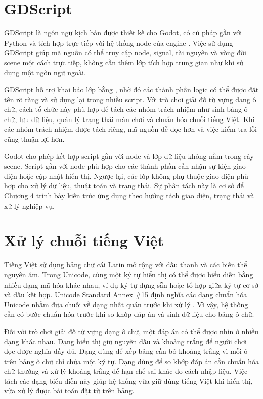 ﻿\documentclass[../DoAn.tex]{subfiles}
\begin{document}
\section{GDScript}
GDScript là ngôn ngữ kịch bản được thiết kế cho Godot, có cú pháp gần với Python và tích hợp trực tiếp với hệ thống node của engine \cite{godotGDScript}. Việc sử dụng GDScript giúp mã nguồn có thể truy cập node, signal, tài nguyên và vòng đời scene một cách trực tiếp, không cần thêm lớp tích hợp trung gian như khi sử dụng một ngôn ngữ ngoài.

GDScript hỗ trợ khai báo lớp bằng , nhờ đó các thành phần logic có thể được đặt tên rõ ràng và sử dụng lại trong nhiều script. Với trò chơi giải đố từ vựng dạng ô chữ, cách tổ chức này phù hợp để tách các nhóm trách nhiệm như sinh bảng ô chữ, lưu dữ liệu, quản lý trạng thái màn chơi và chuẩn hóa chuỗi tiếng Việt. Khi các nhóm trách nhiệm được tách riêng, mã nguồn dễ đọc hơn và việc kiểm tra lỗi cũng thuận lợi hơn.

Godot cho phép kết hợp script gắn với node và lớp dữ liệu không nằm trong cây scene. Script gắn với node phù hợp cho các thành phần cần nhận sự kiện giao diện hoặc cập nhật hiển thị. Ngược lại, các lớp không phụ thuộc giao diện phù hợp cho xử lý dữ liệu, thuật toán và trạng thái. Sự phân tách này là cơ sở để Chương 4 trình bày kiến trúc ứng dụng theo hướng tách giao diện, trạng thái và xử lý nghiệp vụ.

\section{Xử lý chuỗi tiếng Việt}
Tiếng Việt sử dụng bảng chữ cái Latin mở rộng với dấu thanh và các biến thể nguyên âm. Trong Unicode, cùng một ký tự hiển thị có thể được biểu diễn bằng nhiều dạng mã hóa khác nhau, ví dụ ký tự dựng sẵn hoặc tổ hợp giữa ký tự cơ sở và dấu kết hợp. Unicode Standard Annex \#15 định nghĩa các dạng chuẩn hóa Unicode nhằm đưa chuỗi về dạng nhất quán trước khi xử lý \cite{unicodeNormalization}. Vì vậy, hệ thống cần có bước chuẩn hóa trước khi so khớp đáp án và sinh dữ liệu cho bảng ô chữ.

Đối với trò chơi giải đố từ vựng dạng ô chữ, một đáp án có thể được nhìn ở nhiều dạng khác nhau. Dạng hiển thị giữ nguyên dấu và khoảng trắng để người chơi đọc được nghĩa đầy đủ. Dạng dùng để xếp bảng cần bỏ khoảng trắng vì mỗi ô trên bảng ô chữ chỉ chứa một ký tự. Dạng dùng để so khớp đáp án cần chuẩn hóa chữ thường và xử lý khoảng trắng để hạn chế sai khác do cách nhập liệu. Việc tách các dạng biểu diễn này giúp hệ thống vừa giữ đúng tiếng Việt khi hiển thị, vừa xử lý được bài toán đặt từ trên bảng.
\end{document}
